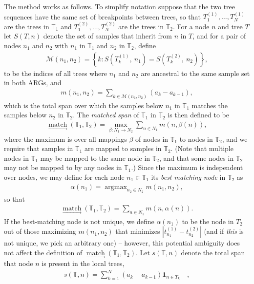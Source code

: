 \documentclass[10pt,twoside,lineno]{gsajnl}
\newcommand{\T}{\mathbb{T}}
\newcommand{\ind}{\mathbf{1}}
\newcommand{\argmax}{\operatorname{argmax}}
\newcommand{\match}{\underset{\longrightarrow}{\operatorname{match}}}
\begin{document}
The method works as follows.
To simplify notation suppose that the two tree sequences have the same set of breakpoints
between trees,
so that $T_1^{(1)}, \ldots, T_N^{(1)}$ are the trees in $\T_1$
and $T_1^{(2)}, \ldots, T_N^{(2)}$ are the trees in $\T_2$.
For a node $n$ and tree $T$
let $S(T, n)$ denote the set of samples that inherit from $n$ in $T$,
and for a pair of nodes $n_1$ and $n_2$ with $n_1$ in $\T_1$ and $n_2$ in $\T_2$,
define
\begin{align*}
	\mathcal{M}(n_1, n_2) = \left\{ k : S\left(T^{(1)}_k,\ n_1\right) = S\left(T^{(2)}_k,\ n_2\right) \right\},
\end{align*}
to be the indices of all trees where $n_1$ and $n_2$ are ancestral to the same sample set in both ARGs,
and
\begin{align*}
    m(n_1, n_2)
    =
    \sum_{k\in \mathcal{M}(n_1, n_2)} (a_k - a_{k-1}) ,  
\end{align*}
which is the total span over which the samples below $n_1$ in $\T_1$
matches the samples below $n_2$ in $\T_2$.
The \emph{matched span} of $\T_1$ in $\T_2$ is then defined to be
\begin{align*}
    \match(\T_1, \T_2)
    =
    \max_{\beta:N_1 \to N_2} \sum_{n \in N_1} m(n, \beta(n)) ,
\end{align*}
where the maximum is over all mappings $\beta$ of nodes in $\T_1$ to nodes in $\T_2$, 
and we require that samples in $\T_1$ are mapped to samples in $\T_2$.
(Note that multiple nodes in $\T_1$ may be mapped to the same node in $\T_2$,
and that some nodes in $\T_2$ may not be mapped to by any nodes in $\T_1$.)
Since the maximum is independent over nodes, we may define for each node $n_1 \in \T_1$
its \emph{best matching node} in $\T_2$ as
\begin{align*}
    \alpha(n_1) = \argmax_{n_2 \in N_2} m(n_1, n_2) ,
\end{align*}
so that
\begin{align}\label{eqn:matched-spans}
    \match(\T_1, \T_2)
    =
    \sum_{n \in N_1} m(n, \alpha(n)) .
\end{align}
If the best-matching node is not unique, we define $\alpha(n_1)$ to be the node in $T_2$
out of those maximizing $m(n_1, n_2)$ that minimizes $|t^{(1)}_{n_1} - t^{(2)}_{n_2}|$
(and if \emph{this} is not unique, we pick an arbitrary one) --
however, this potential ambiguity does not affect the definition of $\match(\T_1, \T_2)$.
Let $s(\T,n)$ denote the total span that node $n$ is present in the local trees,
\begin{align*}
	s(\T, n) = \sum_{k=1}^N (a_k - a_{k-1}) \ind_{n \in T_k} \quad ,
\end{align*}
\end{document}
